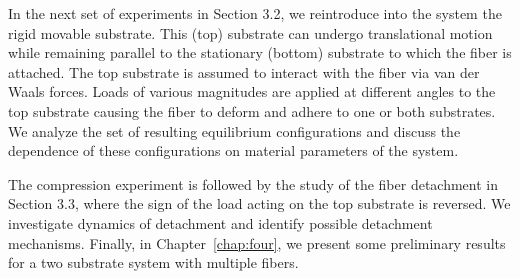 In the next set of experiments in Section 3.2, we reintroduce into the system the rigid movable substrate. 
This (top) substrate can undergo translational motion while remaining parallel to the stationary (bottom) substrate to which the fiber is attached. 
The top substrate is assumed to interact with the fiber via van der Waals forces. Loads of various magnitudes are applied at different angles to the top substrate causing the fiber to deform and adhere to one or both substrates. 
We analyze the set of resulting equilibrium configurations and discuss the dependence of these configurations on material parameters of the system.

The compression experiment is followed by the study of the fiber detachment in Section 3.3, where the sign of the load acting on the top substrate is reversed. 
We investigate dynamics of detachment and identify possible detachment mechanisms. 
Finally, in Chapter~\ref{chap:four}, we present some preliminary results for a two substrate system with multiple fibers.